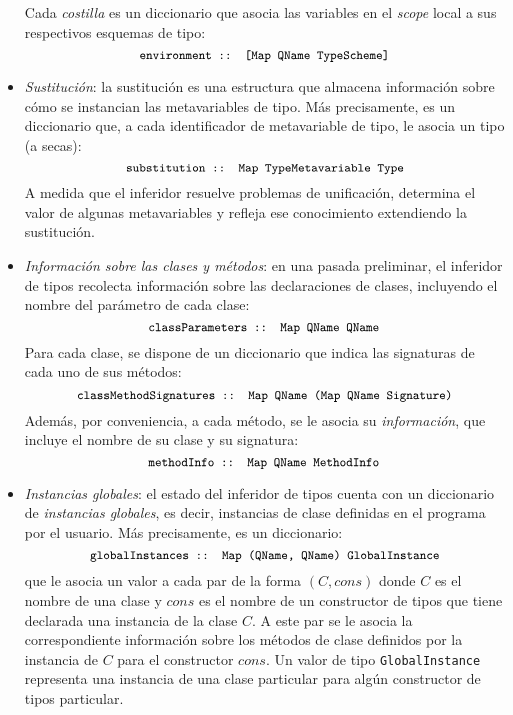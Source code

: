 \begin{itemize}
    Cada {\em costilla} es un diccionario que asocia las variables
    en el {\em scope} local a sus respectivos esquemas de tipo:
    \[ {\small \texttt{environment :: [Map QName TypeScheme]}} \]
  \item {\em Sustitución}:
    la sustitución es una estructura que almacena información sobre cómo
    se instancian las metavariables de tipo.
    Más precisamente, es un diccionario que, a cada identificador de
    metavariable de tipo, le asocia un tipo (a secas):
    \[ {\small \texttt{substitution :: Map TypeMetavariable Type}} \]
    A medida que el inferidor resuelve problemas de unificación,
    determina el valor de algunas metavariables y refleja ese
    conocimiento extendiendo la sustitución.
  \item {\em Información sobre las clases y métodos}:
    en una pasada preliminar, el inferidor de tipos recolecta información
    sobre las declaraciones de clases, incluyendo el nombre del parámetro
    de cada clase:
    \[ {\small \texttt{classParameters :: Map QName QName}} \]
    Para cada clase, se dispone de un diccionario que indica las
    signaturas de cada uno de sus métodos:
    \[ {\small \texttt{classMethodSignatures :: Map QName (Map QName Signature)}} \]
    Además, por conveniencia, a cada método, se le asocia su {\em información},
    que incluye el nombre de su clase y su signatura:
    \[ {\small \texttt{methodInfo :: Map QName MethodInfo}} \]
  \item {\em Instancias globales}:
    el estado del inferidor de tipos cuenta con un diccionario de {\em instancias globales},
    es decir, instancias de clase definidas en el programa por el usuario.
    Más precisamente, es un diccionario:
    \[ {\small \texttt{globalInstances :: Map (QName, QName) GlobalInstance}} \]
    que le asocia un valor
    a cada par de la forma $(C, cons)$ donde $C$ es el nombre de una clase y $cons$
    es el nombre de un constructor de tipos que tiene declarada una instancia de la clase $C$.
    A este par se le asocia la correspondiente información sobre los métodos de clase
    definidos por la instancia de $C$ para el constructor $cons$.
    Un valor de tipo \verb|GlobalInstance| representa una instancia
    de una clase particular para algún constructor de tipos particular.


\end{itemize}
